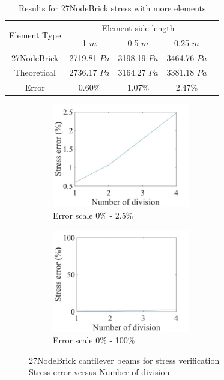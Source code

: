 \documentclass[fleqn,11pt,letter]{article}
\begin{document}
\begin{table}[H]
  \centering
  \caption{Results for 27NodeBrick stress with more elements}
  \label{table Results for 27NodeBrick stress with more elements}
  \begin{tabular}{|c|c|c|c|c|}
    \hline 
    \multirow{2}{*}{Element Type} 
       & \multicolumn{3}{|c|}{Element side length} \\ \cline{2-4}
       & 1 $m$ & 0.5 $m$ & 0.25 $m$ \\                              \hline
27NodeBrick & 2719.81 $Pa$ & 3198.19 $Pa$ & 3464.76 $Pa$ \\ \hline
Theoretical & 2736.17 $Pa$ & 3164.27 $Pa$ & 3381.18 $Pa$ \\ \hline
Error       & 0.60\%  & 1.07\%  & 2.47\%        \\ \hline
  \end{tabular}
\end{table}



\begin{figure}[H]
  \begin{subfigure}{0.5\textwidth}
    \centering
    \includegraphics[width=6cm]{../Figure_files/27NodeBrick/error27brick_beam_stress.jpeg}
    \caption{Error scale 0\% - 2.5\%}
  \end{subfigure}
  \begin{subfigure}{0.5\textwidth}
    \centering
    \includegraphics[width=6cm]{../Figure_files/27NodeBrick/error27brick_beam_stress100.jpeg}
    \caption{Error scale 0\% - 100\%}
  \end{subfigure}
  \captionsetup{justification=centering,margin=3cm}
  \caption{27NodeBrick cantilever beams for stress verification\\
      Stress error   versus   Number of division}
\end{figure}
\end{document}
